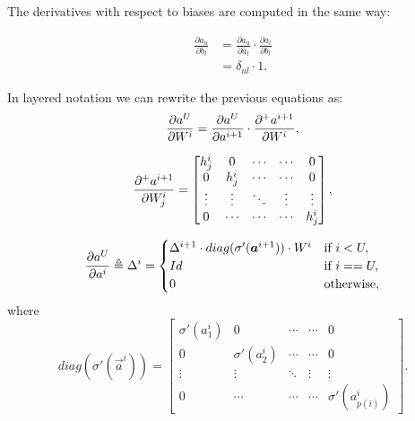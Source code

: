 The derivatives with respect to biases are computed in the same way:

\begin{align}
\frac{\partial a_u}{\partial b_{l}} &= \frac{\partial a_u}{\partial a_l} \cdot \frac{\partial a_l}{\partial b_{l}}\\
&=\delta_{ul} \cdot 1.
\end{align}



In layered notation we can rewrite the previous equations as:
\begin{equation}
 \frac{\partial a^U}{\partial W^i} = \frac{\partial a^U}{\partial a^{i+1}} \cdot \frac{\partial^{+} a^{i+1}}{\partial W^i},
\end{equation}


\begin{equation}
\frac{\partial^{+} a^{i+1}}{\partial W_j^i} =
 \begin{bmatrix}
   h_j^{i}    & 0                & \cdots      & \cdots       & 0  \\
   0               & h_j^{i}     & \cdots      & \cdots       & 0  \\
   \vdots          & \vdots           & \ddots      & \vdots       &\vdots\\
   0               & \cdots           & \cdots      & \cdots       & h^{i}_{j}
\end{bmatrix},
\end{equation}

\begin{equation}
\frac{\partial a^U}{\partial a^{i}} \triangleq \Delta^{i} = 
\begin{cases}
      \Delta^{i+1} \cdot diag(\sigma'(\boldsymbol{a}^{i+1})) \cdot W^{i}  & \text{if } i<U,\\
      Id & \text{if } i==U,\\
    0 & \text{otherwise},
\end{cases}
\label{fnn_delta}
\end{equation}
where
\begin{equation}
diag(\sigma'(\vec{a}^{i})) =
 \begin{bmatrix}
   \sigma'(a^{i}_1)    & 0                & \cdots      & \cdots       & 0  \\
   0                     & \sigma'(a^{i}_2)     & \cdots      & \cdots       & 0  \\
   \vdots                & \vdots           & \ddots      & \vdots       &\vdots\\
   0                     & \cdots           & \cdots      & \cdots       &\sigma'(a^{i}_{p(i)})
\end{bmatrix}.
\end{equation}

